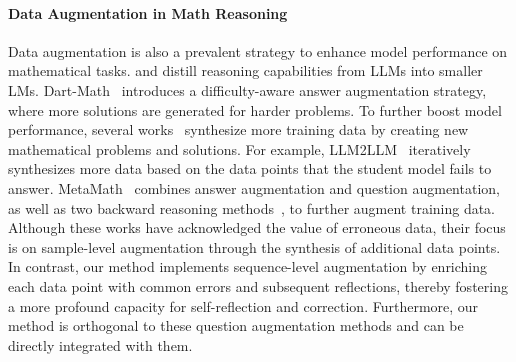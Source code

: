 \documentclass[11pt]{article}
\begin{document}
\paragraph{Data Augmentation in Math Reasoning}
Data augmentation is also a prevalent strategy to enhance model performance on mathematical tasks.
\citet{magister2023teaching} and \citet{yuemammoth} distill reasoning capabilities from LLMs into smaller LMs. Dart-Math~\cite{tong2024dartmath} introduces a difficulty-aware answer augmentation strategy, where more solutions are generated for harder problems.
To further boost model performance, several works~\cite{tangmathscale,huang2024key,yue2024mammoth2,liu2024augmenting,wanginvestalign,zhou2024jiuzhang3,ding2024unleashing,lu-etal-2024-mathgenie,li2024common,luo2023wizardmath,li2024mugglemath,lee2024llm2llm} synthesize more training data by creating new mathematical problems and solutions.
For example, LLM2LLM~\cite{lee2024llm2llm} iteratively synthesizes more data based on the data points that the student model fails to answer. MetaMath~\cite{yumetamath} combines answer augmentation and question augmentation, as well as two backward reasoning methods~\cite{jiang2024forward,weng-etal-2023-large}, to further augment training data. Although these works have acknowledged the value of erroneous data, their focus is on sample-level augmentation through the synthesis of additional data points. In contrast, our method implements sequence-level augmentation by enriching each data point with common errors and subsequent reflections, thereby fostering a more profound capacity for self-reflection and correction. Furthermore, our method is orthogonal to these question augmentation methods and can be directly integrated with them.
\end{document}
